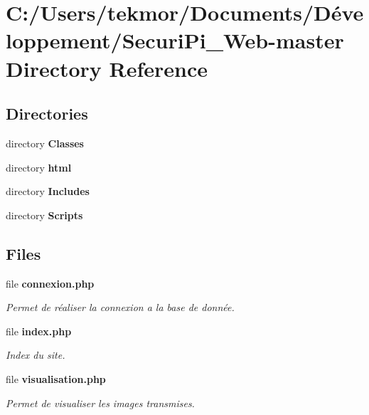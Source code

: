 \section{C\+:/\+Users/tekmor/\+Documents/\+Développement/\+Securi\+Pi\+\_\+\+Web-\/master Directory Reference}
\label{dir_1ddd1ae913546bb4c599a94d3071cd8b}
\subsection*{Directories}
\begin{DoxyCompactItemize}
\item 
directory {\bf Classes}
\item 
directory {\bf html}
\item 
directory {\bf Includes}
\item 
directory {\bf Scripts}
\end{DoxyCompactItemize}
\subsection*{Files}
\begin{DoxyCompactItemize}
\item 
file {\bf connexion.\+php}
\begin{DoxyCompactList}\small\item\em Permet de réaliser la connexion a la base de donnée. \end{DoxyCompactList}\item 
file {\bf index.\+php}
\begin{DoxyCompactList}\small\item\em Index du site. \end{DoxyCompactList}\item 
file {\bf visualisation.\+php}
\begin{DoxyCompactList}\small\item\em Permet de visualiser les images transmises. \end{DoxyCompactList}\end{DoxyCompactItemize}
